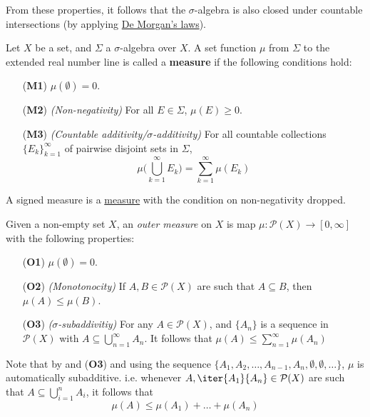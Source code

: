 From these properties, it follows that the $\sigma$-algebra is also closed
under countable intersections (by applying \href{c28492b}{De Morgan's laws}).

\label{f7f1db2}

Let $X$ be a set, and $\Sigma$ a $\sigma$-algebra over $X$. A set function
$\mu$ from $\Sigma$ to the extended real number line is called a
\textbf{measure} if the following conditions hold:
\begin{itemize}
  \item[(\textbf{M1})] $\mu(\emptyset)=0$.
  \item[(\textbf{M2})] \textit{(Non-negativity)} For all $E\in\Sigma$,
        $\mu(E)\geq0$.
  \item[(\textbf{M3})] \textit{(Countable additivity/$\sigma$-additivity)} For
        all countable collections $\{E_k\}_{k=1}^\infty$ of pairwise disjoint sets
        in $\Sigma$,
        $$
          \mu\biggl(\bigcup_{k=1}^\infty E_k\biggr)=\sum_{k=1}^\infty\mu(E_k)
        $$
\end{itemize}

\label{e8f6d6e}

A signed measure is a \href{f7f1db2}{measure} with the condition on
non-negativity dropped.

\label{ae9b304}

Given a non-empty set $X$, an \textit{outer measure} on $X$ is map
$\mu:\mathcal P(X)\to[0,\infty]$ with the following properties:
\begin{itemize}
  \item[(\textbf{O1})] $\mu(\emptyset)=0$.
  \item[(\textbf{O2})] \textit{(Monotonocity)} If $A,B\in\mathcal P(X)$ are such
        that $A\subseteq B$, then $\mu(A)\leq\mu(B)$.
  \item[(\textbf{O3})] \textit{($\sigma$-subaddivitiy)} For any $A\in\mathcal
        P(X)$, and $\{A_n\}$ is a sequence in $\mathcal P(X)$ with
        $A\subseteq\bigcup_{n=1}^\infty A_n$. It follows that
        $\mu(A)\leq\sum_{n=1}^\infty\mu(A_n)$
\end{itemize}

Note that by and (\textbf{O3}) and using the sequence
$\{A_1,A_2,\ldots,A_{n-1},A_n,\emptyset,\emptyset,\ldots\}$, $\mu$ is
automatically subadditive. i.e. whenever $A,\iter{A_1}{A_n}\in\mathcal P(X)$
are such that $A\subseteq\bigcup_{i=1}^nA_i$, it follows that
$$
  \mu(A)\leq\mu(A_1)+\ldots+\mu(A_n)
$$
